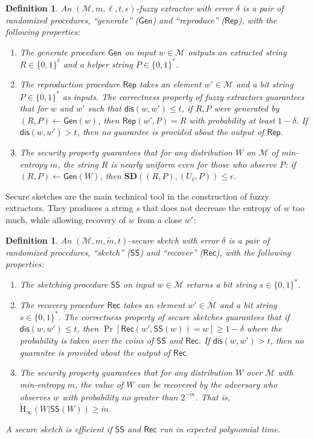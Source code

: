 \documentclass[11pt]{article}
\newcommand{\class}[1]{{\ensuremath{\mathsf{#1}}}}
\newcommand{\gen}{\ensuremath{\class{Gen}}\xspace}
\newcommand{\rep}{\ensuremath{\class{Rep}}\xspace}
\newcommand{\sketch}{\ensuremath{\class{SS}}\xspace}
\newcommand{\rec}{\ensuremath{\class{Rec}}\xspace}
\newcommand{\dis}{\ensuremath{\mathsf{dis}}}
\newcommand{\Hav}{\tilde{\mathrm{H}}_\infty}
\newtheorem{definition}[theorem]{Definition}
\begin{document}
\begin{definition}%
An $(\mathcal{M}, m, \ell, t, \epsilon)$-\emph{fuzzy extractor} with error $\delta$ is a pair of randomized procedures, ``generate'' (\gen) and ``reproduce'' (\rep), with the following properties:
\begin{enumerate}
\item The generate procedure \gen on input $w\in \mathcal{M}$ outputs an extracted string $R\in\{0,1\}^\ell$ and a helper string $P\in\{0,1\}^*$.
\item The reproduction procedure \rep takes an element $w'\in \mathcal{M}$ and a bit string $P\in\{0,1\}^*$ as inputs.  The \emph{correctness} property of fuzzy extractors guarantees that for $w$ and $w'$ such that $\dis(w,w')\leq t$, if $R,P$ were generated by $(R,P)\leftarrow\gen(w)$, then $\rep(w',P)=R$ with probability at least $1-\delta$.  If $\dis(w,w')>t$, then no guarantee is provided about the output of \rep.
\item The \emph{security} property guarantees that for any distribution $W$ on $\mathcal{M}$ of min-entropy $m$, the string $R$ is nearly uniform even for those who observe $P$:  if $(R,P)\leftarrow\gen (W)$, then $\mathbf{SD}((R,P),(U_\ell,P))\leq \epsilon$.
\end{enumerate}
\end{definition}

Secure sketches are the main technical tool in the construction of fuzzy extractors.  They produces a string $s$ that does not decrease the entropy of $w$ too much, while allowing recovery of $w$ from a  close $w'$:
\begin{definition}%
\label{def:secure sketch}
An $(\mathcal{M},m, \tilde{m}, t)$-\emph{secure sketch} with error $\delta$ is a pair of randomized procedures, ``sketch'' (\sketch) and ``recover'' (\rec), with the following properties:
\begin{enumerate}
\item The sketching procedure \sketch on input $w\in\mathcal{M}$ returns a bit string $s\in\{0,1\}^*$.
\item The recovery procedure \rec takes an element $w'\in\mathcal{M}$ and a bit string $s\in\{0,1\}^*$.  The \emph{correctness} property of secure sketches guarantees that if $\dis(w,w')\leq t$, then $\Pr[\rec(w',\sketch(w))=w]\geq 1-\delta$ where the probability is taken over the coins of $\sketch$ and $\rec$.  If $\dis(w,w')>t$, then no guarantee is provided about the output of \rec.
\item The \emph{security} property guarantees that for any distribution $W$ over $\mathcal{M}$ with min-entropy $m$, the value of $W$ can be recovered by the adversary who observes $w$ with probability no greater than $2^{-\tilde{m}}$.  That is, $\Hav(W|\sketch(W))\geq \tilde{m}$.
\end{enumerate}
A secure sketch is \emph{efficient} if \sketch and \rec run in expected polynomial time. 
\end{definition}
\end{document}
